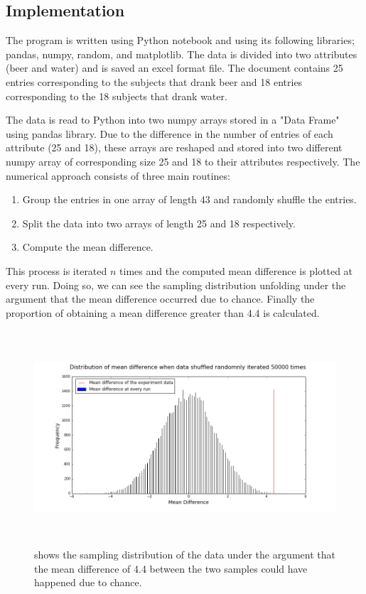 \subsection{Implementation}
The program is written using Python notebook and using its following libraries; pandas, numpy, random, and matplotlib. The data is divided into two attributes (beer and water) and is saved an excel format file. The document contains 25 entries corresponding to the subjects that drank beer and 18  entries corresponding to the 18 subjects that drank water.

The data is read to Python into two numpy arrays stored in a "Data Frame" using pandas library. Due to the difference in the number of entries of each attribute (25 and 18), these arrays are reshaped and stored into two different numpy array of corresponding size 25 and 18 to their attributes respectively.
The numerical approach consists of three main routines:
\begin{enumerate}
  \item Group the entries in one array of length 43 and randomly shuffle the entries.
  \item Split the data into two arrays of length 25 and 18 respectively.
  \item Compute the mean difference.
\end{enumerate}
This process is iterated $n$ times and the computed mean difference is plotted at every run. Doing so, we can see the sampling distribution unfolding under the argument that the mean difference occurred due to chance. Finally the proportion of obtaining a mean difference greater than 4.4 is calculated.

\begin{figure}[t]
\centerline{\includegraphics[height=8cm,width=16cm]{./figures/distribution_50k}}
\caption{shows the sampling distribution of the data under the argument that the mean difference of 4.4 between the two samples could have happened due to chance. \label{histogram}}
\end{figure}

